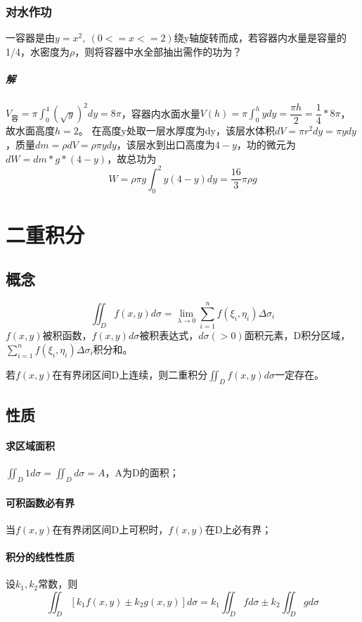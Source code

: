 \subsubsection{对水作功}
一容器是由\(y = x^2,\ (0 <= x <= 2)\)绕y轴旋转而成，若容器内水量是容量的1/4，水密度为\(\rho\)，则将容器中水全部抽出需作的功为？
\subparagraph{解}
\(V_{\text{容}} = \pi\displaystyle\int_0^4(\sqrt{y})^2dy = 8\pi\)，容器内水面水量\(V(h) = \pi\displaystyle\int_0^hydy = \dfrac{\pi h}{2} = \dfrac{1}{4} * 8\pi\)，故水面高度\(h = 2\)。
在高度y处取一层水厚度为dy，该层水体积\(dV = \pi r^2dy = \pi ydy\)，质量\(dm = \rho dV = \rho\pi ydy\)，该层水到出口高度为\(4 - y\)，功的微元为\(dW = dm * g * (4 - y)\)，故总功为\[W = \rho\pi g\int_0^2y(4 - y)dy = \dfrac{16}{3}\pi\rho g\]



\section{二重积分}

\subsection{概念}
\[\iint_Df(x, y)d\sigma = \lim_{\lambda \to 0}\sum_{i = 1}^nf(\xi_i, \eta_i)\Delta\sigma_i\]
\(f(x, y)\)被积函数，\(f(x, y)d\sigma\)被积表达式，\(d\sigma( > 0)\)面积元素，D积分区域，\(\displaystyle\sum_{i = 1}^nf(\xi_i, \eta_i)\Delta\sigma_i\)积分和。

若\(f(x, y)\)在有界闭区间D上连续，则二重积分\(\displaystyle\iint_Df(x, y)d\sigma\)一定存在。


\subsection{性质}

\paragraph{求区域面积}
\(\displaystyle\iint_D1d\sigma = \iint_Dd\sigma = A\)，A为D的面积；

\paragraph{可积函数必有界}
当\(f(x, y)\)在有界闭区间D上可积时，\(f(x, y)\)在D上必有界；

\paragraph{积分的线性性质}
设\(k_1, k_2\)常数，则\[\iint_D[k_1f(x, y) \pm k_2g(x, y)]d\sigma = k_1\iint_Dfd\sigma \pm k_2\iint_Dgd\sigma\]

